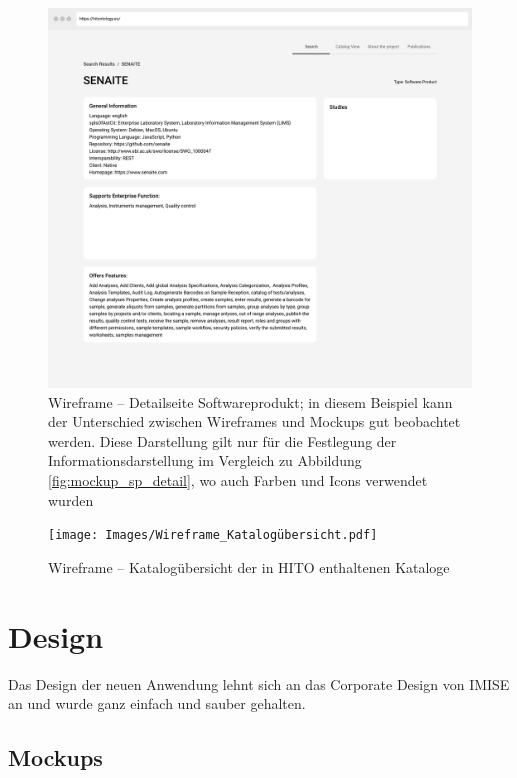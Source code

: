\begin{figure}[H]
    	\includegraphics[width=\textwidth]{Images/Wireframe_Detail_SP}
   	\caption[Wireframe -- Detailseite Softwareprodukt]{Wireframe -- Detailseite Softwareprodukt; in diesem Beispiel kann der Unterschied zwischen Wireframes und Mockups gut beobachtet werden. Diese Darstellung gilt nur für die Festlegung der Informationsdarstellung im Vergleich zu Abbildung \ref{fig:mockup_sp_detail}, wo auch Farben und Icons verwendet wurden}
   	\label{fig:wireframe_detail_sp}
\end{figure}

\clearpage

\begin{figure}
	\centering
    	\texttt{[image: Images/Wireframe\_Katalogübersicht.pdf]}
   	\caption[Wireframe -- Katalogübersicht]{Wireframe -- Katalogübersicht der in HITO enthaltenen Kataloge}
   	\label{fig:wireframe_catalogue}
\end{figure}

\clearpage

\section{Design}

Das Design der neuen Anwendung lehnt sich an das Corporate Design von IMISE an und wurde ganz einfach und sauber gehalten.

\subsection{Mockups}

